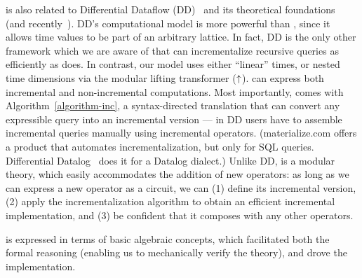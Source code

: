 \dbsp is also related to Differential Dataflow (DD)~\cite{mcsherry-cidr13, murray-sosp13}
and its theoretical foundations~\cite{abadi-fossacs15} (and recently~\cite{mcsherry-vldb20,chothia-vldb16}).
DD's computational model is more powerful than
\dbsp, since it allows time values to be part of an arbitrary lattice.
In fact, DD is the only other framework which we are aware of that can incrementalize
recursive queries as efficiently as \dbsp does.
In contrast, our model uses either ``linear'' times, or nested time dimensions via the modular lifting transformer (${\uparrow}$).
\dbsp can express both
incremental and non-incremental computations.  Most importantly, \dbsp comes with Algorithm~\ref{algorithm-inc}, a syntax-directed translation that can convert
any expressible query into an incremental version --- in DD users have
to assemble incremental queries manually using incremental operators.
(materialize.com offers a product that automates incrementalization, but only 
for SQL queries.  Differential Datalog~\cite{ryzhyk-datalog19}
does it for a Datalog dialect.)  Unlike DD, \dbsp is a modular theory, 
which easily accommodates the addition of new operators:  as long as we can 
express a new operator as a \dbsp circuit, we can (1) define its incremental version, 
(2) apply the incrementalization algorithm to obtain an efficient 
incremental implementation, and (3) be confident that it composes with any 
other operators.

\dbsp is expressed in terms of basic algebraic concepts, which facilitated
both the formal reasoning (enabling us to mechanically verify the theory), and drove
the implementation.

\begin{comment}
\dbsp using non-nested streams is a simplified instance of a Kahn 
network~\cite{kahn-ifip74}.  Johnson~\cite{johnson-phd83}
studies a very similar computational model without nested streams and its 
expressiveness. The implementation of such streaming models of computation and their
relationship to dataflow machines has been studied by Lee~\cite{lee-ieee95}.
Lee~\cite{lee-ifip93} also introduced streams of streams and the $\lift{\zm}$ operator.
\end{comment}